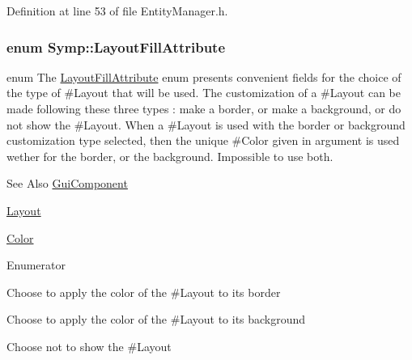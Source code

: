 Definition at line 53 of file Entity\-Manager.\-h.

\hypertarget{namespace_symp_a30499696a7501e2c08fdf0b3094484fb}{
\subsubsection[{Layout\-Fill\-Attribute}]{\setlength{\rightskip}{0pt plus 5cm}enum {\bf Symp\-::\-Layout\-Fill\-Attribute}}}\label{namespace_symp_a30499696a7501e2c08fdf0b3094484fb}
enum The \hyperlink{namespace_symp_a30499696a7501e2c08fdf0b3094484fb}{Layout\-Fill\-Attribute} enum presents convenient fields for the choice of the type of \#\-Layout that will be used. The customization of a \#\-Layout can be made following these three types \-: make a border, or make a background, or do not show the \#\-Layout. When a \#\-Layout is used with the border or background customization type selected, then the unique \#\-Color given in argument is used wether for the border, or the background. Impossible to use both. \begin{DoxySeeAlso}{See Also}
\hyperlink{class_symp_1_1_gui_component}{Gui\-Component} 

\hyperlink{class_symp_1_1_layout}{Layout} 

\hyperlink{struct_symp_1_1_color}{Color} 
\end{DoxySeeAlso}
\begin{Desc}
\item[Enumerator]\par
\begin{description}
\item[{\em 
\hypertarget{namespace_symp_a30499696a7501e2c08fdf0b3094484fbae3bc233b48718363a050cd29711e3367}{B\-O\-R\-D\-E\-R}\label{namespace_symp_a30499696a7501e2c08fdf0b3094484fbae3bc233b48718363a050cd29711e3367}
}]Choose to apply the color of the \#\-Layout to its border \item[{\em 
\hypertarget{namespace_symp_a30499696a7501e2c08fdf0b3094484fbac3ac2f33d4d9f540529fc9ddcc9a689b}{B\-A\-C\-K\-G\-R\-O\-U\-N\-D}\label{namespace_symp_a30499696a7501e2c08fdf0b3094484fbac3ac2f33d4d9f540529fc9ddcc9a689b}
}]Choose to apply the color of the \#\-Layout to its background \item[{\em 
\hypertarget{namespace_symp_a30499696a7501e2c08fdf0b3094484fbad44494c9dc289ce3c21d24da5a8e9ecc}{N\-O\-N\-E}\label{namespace_symp_a30499696a7501e2c08fdf0b3094484fbad44494c9dc289ce3c21d24da5a8e9ecc}
}]Choose not to show the \#\-Layout \end{description}
\end{Desc}


